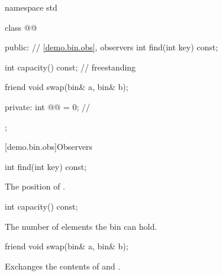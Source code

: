 \begin{codeblock}
namespace std {
  class @@ {
  public:
    // \ref{demo.bin.obs}, observers
    int find(int key) const;

    int capacity() const; // freestanding

    friend void swap(bin& a, bin& b);

  private:
    int @@ = 0; // \expos
  };
}
\end{codeblock}

[demo.bin.obs]{Observers}

%
\begin{itemdecl}
int find(int key) const;
\end{itemdecl}

\begin{itemdescr}
\pnum
\returns
The position of .
\end{itemdescr}

%
\begin{itemdecl}
int capacity() const;
\end{itemdecl}

\begin{itemdescr}
\pnum
\returns
The number of elements the bin can hold.
\end{itemdescr}

%
\begin{itemdecl}
friend void swap(bin& a, bin& b);
\end{itemdecl}

\begin{itemdescr}
\pnum
\effects
Exchanges the contents of  and .
\end{itemdescr}
